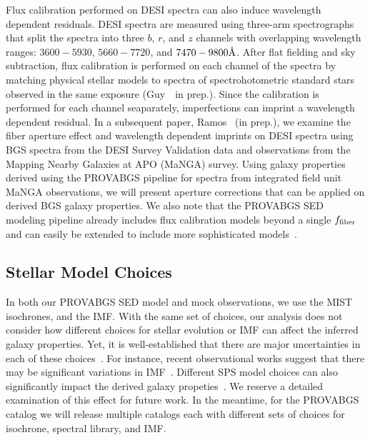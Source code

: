 Flux calibration performed on DESI spectra can also induce wavelength dependent
residuals. 
DESI spectra are measured using three-arm spectrographs that split the spectra
into three $b$, $r$, and $z$ channels with overlapping wavelength ranges: 
$3600 - 5930$, $5660 - 7720$, and $7470 - 9800 \AA$.  
After flat fielding and sky subtraction, flux calibration is performed on each
channel of the spectra by matching physical stellar models to spectra of
spectrohotometric standard stars observed in the same exposure
(Guy~\etal~in prep.). 
Since the calibration is performed for each channel seaparately, imperfections
can imprint a wavelength dependent residual. 
In a subsequent paper, Ramos \etal~(in prep.), we examine the fiber aperture
effect and wavelength dependent imprints on DESI spectra using BGS
spectra from the DESI Survey Validation data and observations from the Mapping
Nearby Galaxies at APO (MaNGA) survey. 
Using galaxy properties derived using the {\sc PROVABGS} pipeline for spectra
from integrated field unit MaNGA observations, we will present aperture
corrections that can be applied on derived BGS galaxy properties. 
We also note that the {\sc PROVABGS} SED modeling pipeline already includes flux
calibration models beyond a single $f_{\rm fiber}$ and can easily be extended
to include more sophisticated models~\citep[\emph{e.g.} Chebyschev
polynomial;][]{carnall2017, tacchella2021}. 

\subsection{Stellar Model Choices}
In both our {\sc PROVABGS} SED model and mock observations, we use the MIST
isochrones, 
and the \cite{chabrier2003} IMF.
With the same set of choices, our analysis does not consider how different
choices for stellar evolution or IMF can affect the inferred galaxy properties. 
Yet, it is well-established that there are major uncertainties in each of these
choices~\citep{conroy2009, conroy2013}.
For instance, recent observational works suggest that there may be significant
variations in IMF~\citep[\emph{e.g.}][]{treu2010, vandokkum2010, rosani2018,
sonnenfeld2019}. 
Different SPS model choices can also significantly impact the derived galaxy
propeties~\citep[\emph{e.g.}][]{ge2019}.
We reserve a detailed examination of this effect for future work. 
In the meantime, for the {\sc PROVABGS} catalog we will release multiple
catalogs each with different sets of choices for isochrone, spectral library,
and IMF.

